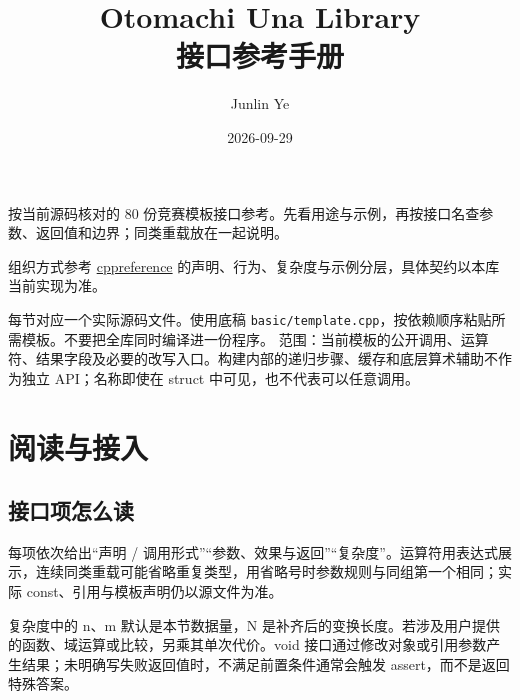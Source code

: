 \documentclass[UTF8,a4paper,10pt]{ctexart}
\title{Otomachi Una Library\\接口参考手册}
\author{Junlin Ye}\date{2026-09-29}
\begin{document}
\begin{titlepage}\maketitle\thispagestyle{empty}
\vspace{1cm}
按当前源码核对的 80 份竞赛模板接口参考。先看用途与示例，再按接口名查参数、返回值和边界；同类重载放在一起说明。

组织方式参考 \href{https://en.cppreference.com/cpp/container/vector}{cppreference} 的声明、行为、复杂度与示例分层，具体契约以本库当前实现为准。

每节对应一个实际源码文件。使用底稿 \texttt{basic/template.cpp}，按依赖顺序粘贴所需模板。不要把全库同时编译进一份程序。
\vfill
范围：当前模板的公开调用、运算符、结果字段及必要的改写入口。构建内部的递归步骤、缓存和底层算术辅助不作为独立 API；名称即使在 struct 中可见，也不代表可以任意调用。
\end{titlepage}
{\small\tableofcontents}\clearpage
\section{阅读与接入}
\subsection*{接口项怎么读}
每项依次给出“声明 / 调用形式”“参数、效果与返回”“复杂度”。运算符用表达式展示，连续同类重载可能省略重复类型，用省略号时参数规则与同组第一个相同；实际 const、引用与模板声明仍以源文件为准。

复杂度中的 n、m 默认是本节数据量，N 是补齐后的变换长度。若涉及用户提供的函数、域运算或比较，另乘其单次代价。void 接口通过修改对象或引用参数产生结果；未明确写失败返回值时，不满足前置条件通常会触发 assert，而不是返回特殊答案。
\end{document}
